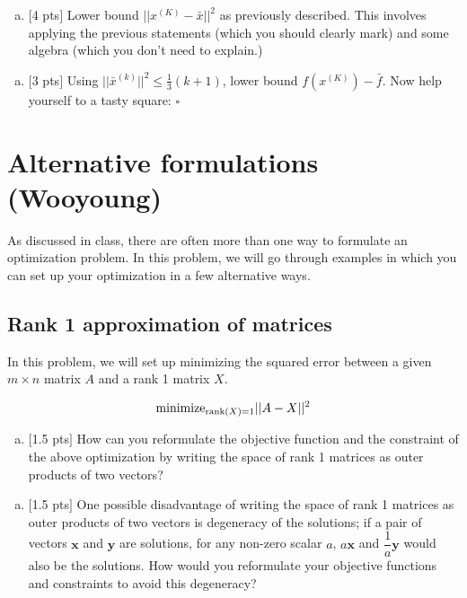 \documentclass[12pt]{article}
\begin{document}
 \begin{enumerate}[(g)]
 \item $[$4 pts$]$ Lower bound $||x^{(K)} - \bar{x}||^2$ as previously described. This involves applying the previous statements (which you should clearly mark) and some algebra (which you don't need to explain.)
  \end{enumerate}
 \vspace{.25cm}
 
 \begin{enumerate}[(h)]
 \item $[$3 pts$]$ Using $||\bar{x}^{(k)}||^2 \leq \frac{1}{3}(k+1)$, lower bound $f(x^{(K)}) - \bar{f}$. Now help yourself to a tasty square: \hfill$\square$ 
 \end{enumerate}
 \vspace{.25cm}

\newpage
\clearpage

\section{ Alternative formulations (Wooyoung)}

As discussed in class, there are often more than one way to formulate an optimization problem. In this problem, we will go through examples in which you can set up your optimization in a few alternative ways.

\subsection{Rank 1 approximation of matrices }
 
In this problem, we will set up minimizing the squared error between a given $m\times n$ matrix $A$ and a rank 1 matrix $X$. 

\begin{equation}
\text{minimize}_{\text{rank}(X)=1} ||A-X||^{2}\\
\nonumber
\end{equation}

\begin{enumerate}[(a)]
\item 
$[$1.5 pts$]$ How can you reformulate the objective function and the constraint of the above optimization by writing the space of rank 1 matrices as outer products of two vectors?
\end{enumerate}
\vspace{.25cm}

\begin{enumerate}[(b)]
\item
$[$1.5 pts$]$ One possible disadvantage of writing the space of rank 1 matrices as outer products of two vectors is degeneracy of the solutions; if a pair of vectors $\mathbf{x}$ and $\mathbf{y}$ are solutions, for any non-zero scalar $a$, $a\mathbf{x}$ and $\dfrac{1}{a}\mathbf{y}$ would also be the solutions. How would you reformulate your objective functions and constraints to avoid this degeneracy?
\end{enumerate}
\vspace{.25cm}
\end{document}
